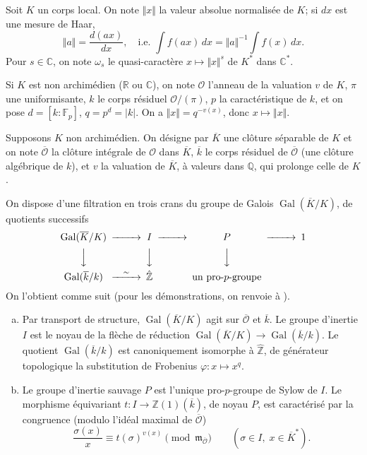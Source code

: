 \documentclass[11pt,a4paper]{amsart}
\theoremstyle{plain}
\theoremstyle{definition}
\DeclareMathOperator{\Gal}{Gal}
\newcommand{\dbZ}{\mathbb{Z}}
\newcommand{\dbQ}{\mathbb{Q}}
\newcommand{\dbR}{\mathbb{R}}
\newcommand{\dbC}{\mathbb{C}}
\newcommand{\dbF}{\mathbb{F}}
\newenvironment{para}{\par\noindent}{\par}
\newcommand{\scrO}{\mathscr{O}}
\newcommand{\ov}[1]{\overline{#1}}
\newcommand{\vl}{\Vert}
\newcommand{\vr}{\Vert}
\begin{document}
\begin{para}\label{para2.2.1}
Soit $K$ un corps local. On note $\vl x \vr$ la valeur absolue normalis\'ee de $K$; si $dx$ est une mesure de Haar,
\[
\vl a \vr = \frac{d(ax)}{dx}, \quad \text{i.e. } \int f(ax)\,dx = \vl a \vr^{-1} \int f(x)\,dx.
\]
Pour $s \in \dbC$, on note $\omega_{s}$ le quasi-caract\`ere $x \mapsto \vl x \vr^{s}$ de $K^{*}$ dans $\dbC^{*}$.
\end{para}

\begin{para}
Si $K$ est non archim\'edien ($\dbR$ ou $\dbC$), on note $\scrO$ l'anneau de la valuation $v$ de $K$, $\pi$ une uniformisante, $k$ le corps r\'esiduel $\scrO/(\pi)$, $p$ la caract\'eristique de $k$, et on pose $d = [k:\dbF_{p}]$, $q = p^{d} = |k|$. On a $\vl x \vr = q^{-v(x)}$, donc $x \mapsto \vl x \vr$.
\end{para}

\begin{para}
Supposons $K$ non archim\'edien. On d\'esigne par $\ov{K}$ une cl\^oture s\'eparable de $K$ et on note $\ov{\scrO}$ la cl\^oture int\'egrale de $\scrO$ dans $\ov{K}$, $\ov{k}$ le corps r\'esiduel de $\ov{\scrO}$ (une cl\^oture alg\'ebrique de $k$), et $v$ la valuation de $\ov{K}$, \`a valeurs dans $\dbQ$, qui prolonge celle de $K$.
\end{para}

\begin{para}
On dispose d'une filtration en trois crans du groupe de Galois $\Gal(\ov{K}/K)$, de quotients successifs
\[
\begin{CD}
\Gal(\ov{K}/K) @>>> I @>>> P @>>> 1 \\
@VVV @VVV @VVV \\
\Gal(\ov{k}/k) @>{\sim}>> \hat{\dbZ} @. \text{un pro-$p$-groupe} @.
\end{CD}
\]
On l'obtient comme suit (pour les d\'emonstrations, on renvoie \`a \cite{10}).
\begin{enumerate}[(a)]
\item Par transport de structure, $\Gal(\ov{K}/K)$ agit sur $\ov{\scrO}$ et $\ov{k}$. Le groupe d'inertie $I$ est le noyau de la fl\`eche de r\'eduction $\Gal(\ov{K}/K) \to \Gal(\ov{k}/k)$. Le quotient $\Gal(\ov{k}/k)$ est canoniquement isomorphe \`a $\hat{\dbZ}$, de g\'en\'erateur topologique la substitution de Frobenius $\varphi: x \mapsto x^{q}$.
\item Le groupe d'inertie sauvage $P$ est l'unique pro-$p$-groupe de Sylow de $I$. Le morphisme \'equivariant $t: I \to \dbZ(1)(\ov{k})$, de noyau $P$, est caract\'eris\'e par la congruence (modulo l'id\'eal maximal de $\ov{\scrO}$)
\[
\frac{\sigma(x)}{x} \equiv t(\sigma)^{v(x)} \pmod{\mathfrak{m}_{\ov{\scrO}}} \qquad (\sigma \in I,\; x \in \ov{K}^{*}).
\]
\end{enumerate}
\end{para}
\end{document}
